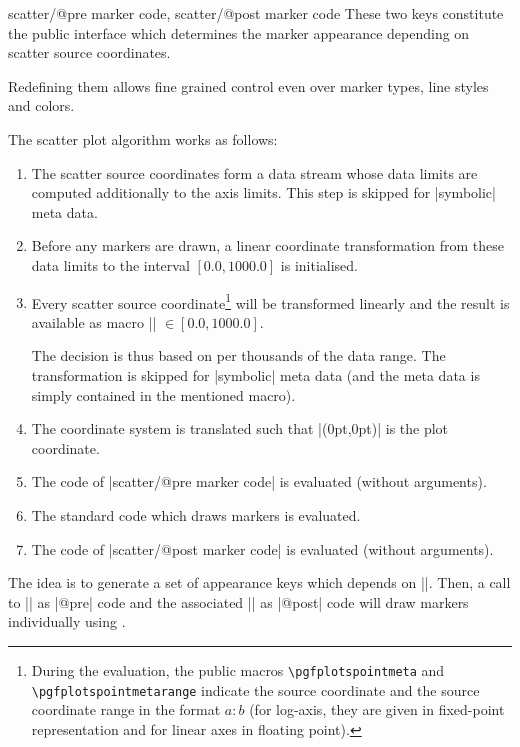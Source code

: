 {\begin{pgfplotsxycodekeylist}{%
    scatter/@pre marker code,
    scatter/@post marker code%
}
\label{pgfplots:example:pointmeta:scatter}
    These two keys constitute the public interface which determines the marker
    appearance depending on scatter source coordinates.

    Redefining them allows fine grained control even over marker types, line
    styles and colors.

    The scatter plot algorithm works as follows:
    \begin{enumerate}
        \item The scatter source coordinates form a data stream whose data
            limits are computed additionally to the axis limits. This step is
            skipped for |symbolic| meta data.
        \item Before any markers are drawn, a linear coordinate
            transformation from these data limits to the interval
            $[0.0,1000.0]$ is initialised.
        \item Every scatter source coordinate\footnote{During the evaluation,
            the public macros \texttt{\textbackslash pgfplotspointmeta} and
            \texttt{\textbackslash pgfplotspointmetarange} indicate the
            source coordinate and the source coordinate range in the format
            $a:b$ (for log-axis, they are given in fixed-point representation
            and for linear axes in floating point).} will be transformed
            linearly and the result is available as macro
            |\pgfplotspointmetatransformed| $ \in [0.0,1000.0]$.

            The decision is thus based on per thousands of the data range.
            The transformation is skipped for |symbolic| meta data (and the
            meta data is simply contained in the mentioned macro).
        \item The \pgfname{} coordinate system is translated such that
            |(0pt,0pt)| is the plot coordinate.
        \item The code of |scatter/@pre marker code| is evaluated (without
            arguments).
        \item The standard code which draws markers is evaluated.
        \item The code of |scatter/@post marker code| is evaluated (without
            arguments).
    \end{enumerate}
    The idea is to generate a set of appearance keys which depends on
    |\pgfplotspointmetatransformed|. Then, a call to |\scope| as |@pre| code and the associated |\endscope| as |@post| code will
    draw markers individually using .


\end{pgfplotsxycodekeylist}}
